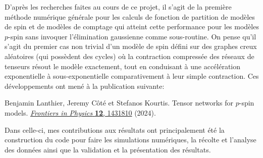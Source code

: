 D'après les recherches faites au cours de ce projet, il s'agit de la première méthode numérique générale pour les calculs de fonction de partition de modèles de spin et de modèles de comptage qui atteint cette performance pour les modèles $p$-spin sans invoquer l'élimination gaussienne comme sous-routine.
On pense qu'il s'agit du premier cas non trivial d'un modèle de spin défini sur des graphes creux aléatoires (qui possèdent des cycles) où la contraction compressée des réseaux de tenseurs résout le modèle exactement, tout en conduisant à une accélération exponentielle à sous-exponentielle comparativement à leur simple contraction.
Ces développements ont mené à la publication suivante:

\noindent Benjamin Lanthier, Jeremy C{\^o}t{\'e} et Stefanos Kourtis.
\newblock Tensor networks for $p$-spin models.
\newblock \href{https://doi.org/10.3389/fphy.2024.1431810}{{\em Frontiers in
Physics}{ \bf 12}, 1431810} (2024).

\noindent Dans celle-ci, mes contributions aux résultats ont principalement été la construction du code pour faire les simulations numériques, la récolte et l'analyse des
données ainsi que la validation et la présentation des résultats.
